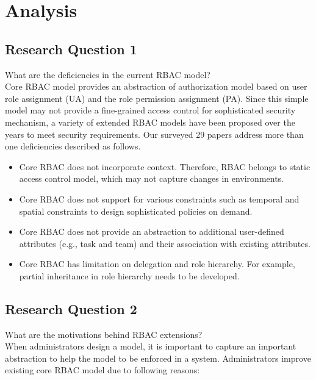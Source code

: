 \section{Analysis} \label{sec:analysis}

\subsection{Research Question 1}

What are the deficiencies in the current RBAC model? \\

Core RBAC model provides an abstraction of authorization model based on user role assignment (UA) and the role
permission assignment (PA). Since this simple model may not provide a fine-grained access control for sophisticated
security mechanism, a variety of extended RBAC models have been proposed over the years to meet
security requirements. Our surveyed 29 papers address more than one deficiencies described as follows.

\begin{itemize}
	\item Core RBAC does not incorporate context. Therefore, RBAC belongs to static access control model, which may not capture changes in environments.
	\item Core RBAC does not support for various constraints such as temporal and spatial constraints to design sophisticated policies on demand.
	\item Core RBAC does not provide an abstraction to additional user-defined attributes	(e.g., task and team) and their association with existing attributes.
	\item Core RBAC has limitation on delegation and role hierarchy. For example, partial inheritance in role hierarchy needs to be developed.  
\end{itemize}

\subsection{Research Question 2}

What are the motivations behind RBAC extensions? \\

When administrators design a model, it is important to capture an important abstraction to help the model to be enforced in a system.
Administrators improve existing core RBAC model due to following reasons:

